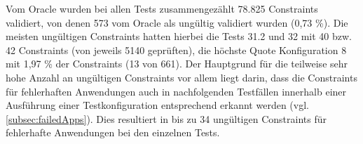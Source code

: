Vom Oracle wurden bei allen Tests zusammengezählt 78.825 Constraints validiert, von denen 573 vom Oracle als ungültig validiert wurden (0,73 \%).
Die meisten ungültigen Constraints hatten hierbei die Tests 31.2 und 32 mit 40 bzw. 42 Constraints (von jeweils 5140 geprüften), die höchste Quote Konfiguration 8 mit 1,97 \% der Constraints (13 von 661).
Der Hauptgrund für die teilweise sehr hohe Anzahl an ungültigen Constraints vor allem liegt darin, dass die Constraints für fehlerhaften Anwendungen auch in nachfolgenden Testfällen innerhalb einer Ausführung einer Testkonfiguration entsprechend erkannt werden (vgl. \cref{subsec:failedApps}).
Dies resultiert in bis zu 34 ungültigen Constraints für fehlerhafte Anwendungen bei den einzelnen Tests.

